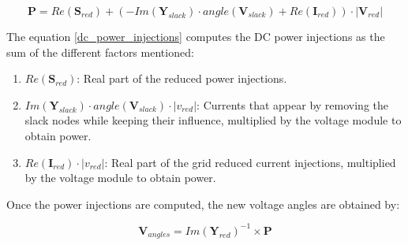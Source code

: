 \documentclass[a4paper,twoside,fleqn]{tufte-book}
\begin{document}
%
%
%
%
%
%
%
%
%

\begin{equation}
\textbf{P} = Re(\textbf{S}_{red}) + (- Im(\textbf{Y}_{slack}) \cdot angle(\textbf{V}_{slack}) + Re(\textbf{I}_{red})) \cdot |\textbf{V}_{red}|
\label{dc_power_injections}
\end{equation}

The equation \ref{dc_power_injections} computes the DC power injections as the sum of the different factors mentioned:

\begin{enumerate}
	\item $Re(\textbf{S}_{red})$: Real part of the reduced power injections.
	\item $Im(\textbf{Y}_{slack}) \cdot angle(\textbf{V}_{slack}) \cdot |v_{red}|$: Currents that appear by removing the slack nodes while keeping their influence, multiplied by the voltage module to obtain power.
	\item $Re(\textbf{I}_{red}) \cdot |v_{red}|$: Real part of the grid reduced current injections, multiplied by the voltage module to obtain power.
\end{enumerate}

Once the power injections are computed, the new voltage angles are obtained by:

\begin{equation}
\textbf{V}_{angles} = Im(\textbf{Y}_{red})^{-1} \times \textbf{P}
\end{equation}
\end{document}
